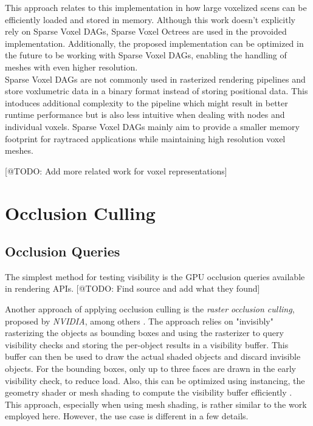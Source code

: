 \noindent
This approach relates to this implementation in how large voxelized scens can be efficiently loaded and stored in 
memory. Although this work doesn't explicitly rely on Sparse Voxel \ac{DAG}s, Sparse Voxel Octrees are used in the 
provoided implementation. Additionally, the proposed implementation can be optimized in the future to be working 
with Sparse Voxel \ac{DAG}s, enabling the handling of meshes with even higher resolution. \\

\noindent
Sparse Voxel \ac{DAG}s are not commonly used in rasterized rendering pipelines and store voxlumetric data in a binary 
format instead of storing positional data. This intoduces additional complexity to the pipeline which might result in 
better runtime performance but is also less intuitive when dealing with nodes and individual voxels. Sparse Voxel 
\ac{DAG}s mainly aim to provide a smaller memory footprint for raytraced applications while maintaining high resolution 
voxel meshes.


[@TODO: Add more related work for voxel representations]

\section{Occlusion Culling}

\subsection*{Occlusion Queries}

The simplest method for testing visibility is the \ac{GPU} occlusion queries available in rendering \ac{API}s.
[@TODO: Find source and add what they found]

Another approach of applying occlusion culling is the \emph{raster occlusion culling}, proposed by \emph{NVIDIA}, among 
others \cite{NVIDIAGLOC2016}. The approach relies on "invisibly" rasterizing the objects as bounding boxes and using the 
rasterizer to query visibility checks and storing the per-object results in a visibility buffer. This buffer can then be 
used to draw the actual shaded objects and discard invisible objects. For the bounding boxes, only up to three faces are 
drawn in the early visibility check, to reduce load. Also, this can be optimized using instancing, the geometry shader or 
mesh shading to compute the visibility buffer efficiently \cite{NVIDIAGLOC2016}. This approach, especially when using 
mesh shading, is rather similar to the work employed here. However, the use case is different in a few details.


